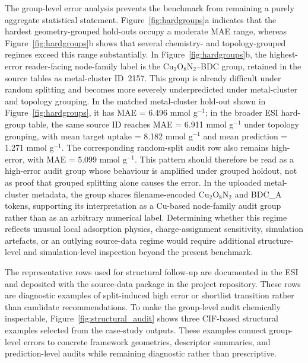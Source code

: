 \documentclass[11pt,a4paper]{article}
\begin{document}
The group-level error analysis prevents the benchmark from remaining a purely aggregate statistical statement. Figure~\ref{fig:hardgroups}a indicates that the hardest geometry-grouped hold-outs occupy a moderate MAE range, whereas Figure~\ref{fig:hardgroups}b shows that several chemistry- and topology-grouped regimes exceed this range substantially. In Figure~\ref{fig:hardgroups}b, the highest-error reader-facing node-family label is the Cu$_2$O$_8$N$_2$--BDC group, retained in the source tables as metal-cluster ID~2157. This group is already difficult under random splitting and becomes more severely underpredicted under metal-cluster and topology grouping. In the matched metal-cluster hold-out shown in Figure~\ref{fig:hardgroups}, it has MAE = 6.496 mmol g$^{-1}$; in the broader ESI hard-group table, the same source ID reaches MAE = 6.911 mmol g$^{-1}$ under topology grouping, with mean target uptake = 8.182 mmol g$^{-1}$ and mean prediction = 1.271 mmol g$^{-1}$. The corresponding random-split audit row also remains high-error, with MAE = 5.099 mmol g$^{-1}$. This pattern should therefore be read as a high-error audit group whose behaviour is amplified under grouped holdout, not as proof that grouped splitting alone causes the error. In the uploaded metal-cluster metadata, the group shares filename-encoded Cu$_2$O$_8$N$_2$ and BDC\_A tokens, supporting its interpretation as a Cu-based node-family audit group rather than as an arbitrary numerical label. Determining whether this regime reflects unusual local adsorption physics, charge-assignment sensitivity, simulation artefacts, or an outlying source-data regime would require additional structure-level and simulation-level inspection beyond the present benchmark.


The representative rows used for structural follow-up are documented in the ESI and deposited with the source-data package in the project repository. These rows are diagnostic examples of split-induced high error or shortlist transition rather than candidate recommendations. To make the group-level audit chemically inspectable, Figure~\ref{fig:structural_audit} shows three CIF-based structural examples selected from the case-study outputs. These examples connect group-level errors to concrete framework geometries, descriptor summaries, and prediction-level audits while remaining diagnostic rather than prescriptive.
\end{document}
